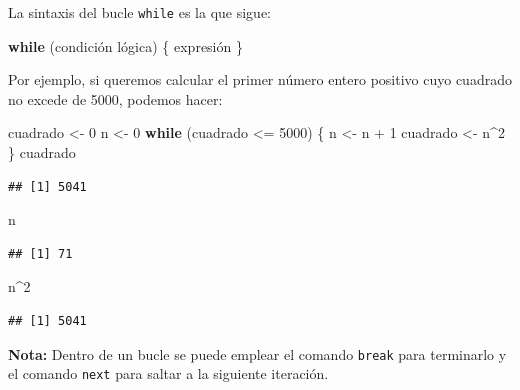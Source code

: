 \documentclass[
]{book}
\newenvironment{Shaded}{\begin{snugshade}}{\end{snugshade}}
\newcommand{\ControlFlowTok}[1]{\textcolor[rgb]{0.13,0.29,0.53}{\textbf{#1}}}
\newcommand{\DecValTok}[1]{\textcolor[rgb]{0.00,0.00,0.81}{#1}}
\newcommand{\NormalTok}[1]{#1}
\newcommand{\OtherTok}[1]{\textcolor[rgb]{0.56,0.35,0.01}{#1}}
\newcommand{\SpecialCharTok}[1]{\textcolor[rgb]{0.00,0.00,0.00}{#1}}
\theoremstyle{break}
\theoremstyle{nonumberplain}
\begin{document}
La sintaxis del bucle \texttt{while}
es la que sigue:

\begin{Shaded}
\begin{Highlighting}[]
\ControlFlowTok{while}\NormalTok{ (condición lógica)  \{ expresión \}}
\end{Highlighting}
\end{Shaded}

Por ejemplo, si queremos calcular el primer número entero positivo cuyo
cuadrado no excede de 5000, podemos hacer:

\begin{Shaded}
\begin{Highlighting}[]
\NormalTok{cuadrado }\OtherTok{\textless{}{-}} \DecValTok{0}
\NormalTok{n }\OtherTok{\textless{}{-}} \DecValTok{0}
\ControlFlowTok{while}\NormalTok{ (cuadrado }\SpecialCharTok{\textless{}=} \DecValTok{5000}\NormalTok{) \{}
\NormalTok{  n }\OtherTok{\textless{}{-}}\NormalTok{ n }\SpecialCharTok{+} \DecValTok{1}
\NormalTok{  cuadrado }\OtherTok{\textless{}{-}}\NormalTok{ n}\SpecialCharTok{\^{}}\DecValTok{2}
\NormalTok{\}}
\NormalTok{cuadrado}
\end{Highlighting}
\end{Shaded}

\begin{verbatim}
## [1] 5041
\end{verbatim}

\begin{Shaded}
\begin{Highlighting}[]
\NormalTok{n}
\end{Highlighting}
\end{Shaded}

\begin{verbatim}
## [1] 71
\end{verbatim}

\begin{Shaded}
\begin{Highlighting}[]
\NormalTok{n}\SpecialCharTok{\^{}}\DecValTok{2}
\end{Highlighting}
\end{Shaded}

\begin{verbatim}
## [1] 5041
\end{verbatim}

\textbf{Nota:} Dentro de un bucle se puede emplear el comando \texttt{break} para terminarlo y el comando \texttt{next} para saltar a la siguiente iteración.
\end{document}
